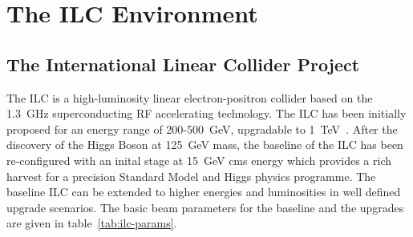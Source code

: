 \chapter{The ILC Environment}



\vspace{2cm}
\section{The International Linear Collider Project}
The ILC is a high-luminosity linear electron-positron collider based on the 1.3~GHz superconducting RF accelerating technology. The ILC has been initially proposed for an energy range of 200-500~GeV, upgradable to 1~TeV~\cite{Behnke:2013xla}. After the discovery of the Higgs Boson at 125~GeV mass, the baseline of the ILC has been re-configured with an inital stage at 15~GeV cms energy which provides a rich harvest for a precision Standard Model and Higgs physics programme. The baseline ILC can be extended to higher energies and luminosities in well defined upgrade scenarios. The basic beam parameters for the baseline and the upgrades are given in table~\ref{tab:ilc-params}.

